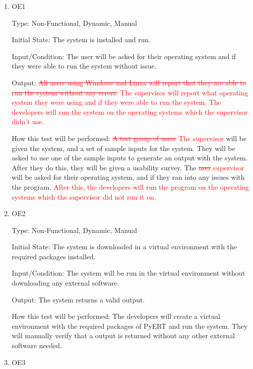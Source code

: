 \documentclass[12pt, titlepage]{article}
\begin{document}
\begin{enumerate}

\item{OE1\\}\label{OE1}

Type: Non-Functional, Dynamic, Manual
					
Initial State: 
The system is installed and run.

Input/Condition: 
The user will be asked for their operating system and if they were able to run the system without issue.

Output: 
\textcolor{red}{\sout{All users using Windows and Linux will report that they are able to run the system without any errors.} The supervisor will report what operating system they were using and if they were able to run the system. The developers will run the system on the operating systems which the supervisor didn't use.}

How this test will be performed: 
\textcolor{red}{\sout{A test group of users} The supervisor} will be given the system, and a set of sample inputs for the system. They will be asked to use one of the sample inputs to generate an output with the system. After they do this, they will be given a usability survey. The \textcolor{red}{\sout{user} supervisor} will be asked for their operating system, and if they ran into any issues with the program. \textcolor{red}{After this, the developers will run the program on the operating systems which the supervisor did not run it on.}
\\
\item{OE2\\}\label{OE2}

Type: Non-Functional, Dynamic, Manual
					
Initial State: 
The system is downloaded in a virtual environment with the required packages installed.

Input/Condition: 
The system will be run in the virtual environment without downloading any external software.

Output: 
The system returns a valid output.

How this test will be performed: 
The developers will create a virtual environment with the required packages of PyERT and run the system. They will manually verify that a output is returned without any other external software needed.
\\
\item{OE3\\}\label{OE3}


\end{enumerate}
\end{document}

